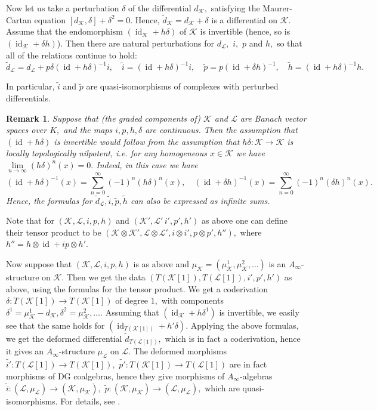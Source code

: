 \documentclass[11pt,leqno]{amsart}
\newtheorem{remark}[theo]{Remark}
\numberwithin{equation}{section}
\newcommand{\cL}{{\mathcal L}}
\newcommand{\cK}{{\mathcal K}}
\newcommand{\id}{\operatorname{id}}
\begin{document}
Now let us take a perturbation $\delta$ of the differential $d_{\cK},$ satisfying the Maurer-Cartan equation $[d_{\cK},\delta]+\delta^2=0.$ Hence, $\tilde{d}_{\cK}=d_{\cK}+\delta$ is a differential on $\cK.$ Assume that the endomorphism $(\id_{\cK}+h\delta)$ of $\cK$ is invertible (hence, so is $(\id_{\cK}+\delta h)$). Then there are natural perturbations for $d_{\cL},$ $i,$ $p$ and $h,$ so that all of the relations continue to hold:
$$\tilde{d}_{\cL}=d_{\cL}+p\delta(\id+h\delta)^{-1}i,\quad \tilde{i}=(\id+h\delta)^{-1}i,\quad \tilde{p}=p(\id+\delta h)^{-1},\quad \tilde{h}=(\id+h\delta)^{-1}h.$$

In particular, $\tilde{i}$ and $\tilde{p}$ are quasi-isomorphisms of complexes with perturbed differentials. 

\begin{remark}\label{remark:top_nilpotent}Suppose that (the graded components of) $\cK$ and $\cL$ are Banach vector spaces over $K,$ and the maps $i,p,h,\delta$ are continuous. Then the assumption that $(\id+h\delta)$ is invertible would follow from the assumption that $h\delta:\cK\to\cK$ is locally topologically nilpotent, i.e. for any homogeneous $x\in\cK$ we have $\lim\limits_{n\to\infty}(h\delta)^n(x)=0.$ Indeed, in this case we have $$(\id+h\delta)^{-1}(x)=\sum\limits_{n=0}^{\infty}(-1)^n(h\delta)^n(x),\quad (\id+\delta h)^{-1}(x)=\sum\limits_{n=0}^{\infty}(-1)^n(\delta h)^n(x).$$ Hence, the formulas for $\tilde{d}_{\cL},\tilde{i},\tilde{p},\tilde{h}$ can also be expressed as infinite sums.\end{remark}

Note that for $(\cK,\cL,i,p,h)$ and $(\cK',\cL'\,i',p',h')$ as above one can define
their tensor product to be $(\cK\otimes\cK',\cL\otimes\cL',i\otimes i', p\otimes p',h''),$ where $h''=h\otimes\id+ip\otimes h'.$   

Now suppose that $(\cK,\cL,i,p,h)$ is as above and $\mu_{\cK}=(\mu_{\cK}^1,\mu_{\cK}^2,\dots)$ is an $A_{\infty}$-structure on $\cK.$ Then we get the data $(T(\cK[1]),T(\cL[1]),i',p',h')$ as above, using the formulas for the tensor product. We get a coderivation $\delta:T(\cK[1])\to T(\cK[1])$ of degree $1,$ with components $\delta^1=\mu^1_{\cK}-d_{\cK},\delta^2=\mu^2_{\cK},\dots.$ Assuming that $(\id_{\cK}+h\delta^1)$ is invertible, we easily see that the same holds for $(\id_{T(\cK[1])}+h'\delta).$ Applying the above formulas, we get the deformed differential $\tilde{d}_{T(\cL[1])},$ which is in fact a coderivation, hence it gives an $A_{\infty}$-structure $\mu_{\cL}$ on $\cL.$ The deformed morphisms $\tilde{i'}:T(\cL[1])\to T(\cK[1]),$ $\tilde{p'}:T(\cK[1])\to T(\cL[1])$ are in fact morphisms of DG coalgebras, hence they give morphisms of $A_{\infty}$-algebras $\tilde{i}:(\cL,\mu_{\cL})\to (\cK,\mu_{\cK}),$ $\tilde{p}:(\cK,\mu_{\cK})\to (\cL,\mu_{\cL}),$ which are quasi-isomorphisms. For details, see \cite[Section 3.3]{CL}.
\end{document}
